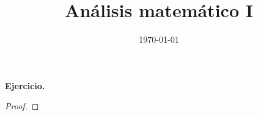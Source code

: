 \documentclass[12pt,a4paper]{article}
\title{Análisis matemático I}
\author{}
\date{\small{\today}}
\begin{document}
\maketitle

\textbf{Ejercicio.}

\begin{proof} \hfill
\end{proof}
\end{document}
